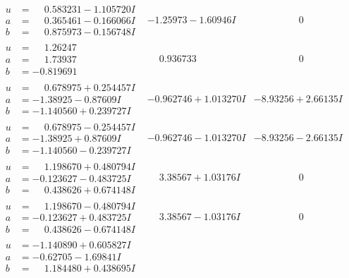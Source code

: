 \documentclass[1p]{elsarticle_modified}
\theoremstyle{definition}
\begin{document}
$$\begin{array}{c|c|c}
\begin{aligned}
u &= \phantom{-}0.583231 - 1.105720 I \\
a &= \phantom{-}0.365461 - 0.166066 I \\
b &= \phantom{-}0.875973 - 0.156748 I\end{aligned}
 & -1.25973 - 1.60946 I & \phantom{-0.000000 } 0 \\ \hline\begin{aligned}
u &= \phantom{-}1.26247\phantom{ +0.000000I} \\
a &= \phantom{-}1.73937\phantom{ +0.000000I} \\
b &= -0.819691\phantom{ +0.000000I}\end{aligned}
 & \phantom{-}0.936733\phantom{ +0.000000I} & \phantom{-0.000000 } 0 \\ \hline\begin{aligned}
u &= \phantom{-}0.678975 + 0.254457 I \\
a &= -1.38925 - 0.87609 I \\
b &= -1.140560 + 0.239727 I\end{aligned}
 & -0.962746 + 1.013270 I & -8.93256 + 2.66135 I \\ \hline\begin{aligned}
u &= \phantom{-}0.678975 - 0.254457 I \\
a &= -1.38925 + 0.87609 I \\
b &= -1.140560 - 0.239727 I\end{aligned}
 & -0.962746 - 1.013270 I & -8.93256 - 2.66135 I \\ \hline\begin{aligned}
u &= \phantom{-}1.198670 + 0.480794 I \\
a &= -0.123627 - 0.483725 I \\
b &= \phantom{-}0.438626 + 0.674148 I\end{aligned}
 & \phantom{-}3.38567 + 1.03176 I & \phantom{-0.000000 } 0 \\ \hline\begin{aligned}
u &= \phantom{-}1.198670 - 0.480794 I \\
a &= -0.123627 + 0.483725 I \\
b &= \phantom{-}0.438626 - 0.674148 I\end{aligned}
 & \phantom{-}3.38567 - 1.03176 I & \phantom{-0.000000 } 0 \\ \hline\begin{aligned}
u &= -1.140890 + 0.605827 I \\
a &= -0.62705 - 1.69841 I \\
b &= \phantom{-}1.184480 + 0.438695 I\end{aligned}

\end{array}$$
\end{document}
